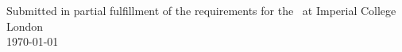 \begin{titlepage}
\vfill %
Submitted in partial fulfillment of the requirements for the \degreetype~at Imperial College London\\[0.5cm]

\makeatletter
{\large \today}\\[2cm] %
\makeatother

\end{titlepage}
